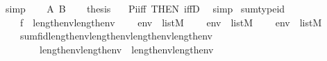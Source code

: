 \begin{isabellebody}
\ simp\isanewline
\ \ \isamarkupfalse%
\ A\ B\isanewline
\ \ \isamarkupfalse%
\ {\isacharquery}{\kern0pt}thesis\ \isamarkupfalse%
\ \ Pi{\isacharunderscore}{\kern0pt}iff\ {\isacharbrackleft}{\kern0pt}THEN\ iffD{}{\isacharbrackright}{\kern0pt}\ \isamarkupfalse%
\ simp\isanewline
{}\isamarkupfalse%
%
\endisatagproof
{\isafoldproof}%
%
\isadelimproof
\isanewline
%
\endisadelimproof
\isanewline
{}\isamarkupfalse%
\ sum{\isacharunderscore}{\kern0pt}type{\isacharunderscore}{\kern0pt}id\ {\isacharcolon}{\kern0pt}\isanewline
\ \ \isanewline
\ \ \ \ {\isachardoublequoteopen}f\ {\isasymin}\ length{\isacharparenleft}{\kern0pt}env{\isacharparenright}{\kern0pt}{\isasymrightarrow}length{\isacharparenleft}{\kern0pt}env{\isacharprime}{\kern0pt}{\isacharparenright}{\kern0pt}{\isachardoublequoteclose}\isanewline
\ \ \ \ {\isachardoublequoteopen}env\ {\isasymin}\ list{\isacharparenleft}{\kern0pt}M{\isacharparenright}{\kern0pt}{\isachardoublequoteclose}\isanewline
\ \ \ \ {\isachardoublequoteopen}env{\isacharprime}{\kern0pt}\ {\isasymin}\ list{\isacharparenleft}{\kern0pt}M{\isacharparenright}{\kern0pt}{\isachardoublequoteclose}\isanewline
\ \ \ \ {\isachardoublequoteopen}env{}\ {\isasymin}\ list{\isacharparenleft}{\kern0pt}M{\isacharparenright}{\kern0pt}{\isachardoublequoteclose}\isanewline
\ \ \isanewline
\ \ \ \ {\isachardoublequoteopen}sum{\isacharparenleft}{\kern0pt}f{\isacharcomma}{\kern0pt}id{\isacharparenleft}{\kern0pt}length{\isacharparenleft}{\kern0pt}env{}{\isacharparenright}{\kern0pt}{\isacharparenright}{\kern0pt}{\isacharcomma}{\kern0pt}length{\isacharparenleft}{\kern0pt}env{\isacharparenright}{\kern0pt}{\isacharcomma}{\kern0pt}length{\isacharparenleft}{\kern0pt}env{\isacharprime}{\kern0pt}{\isacharparenright}{\kern0pt}{\isacharcomma}{\kern0pt}length{\isacharparenleft}{\kern0pt}env{}{\isacharparenright}{\kern0pt}{\isacharparenright}{\kern0pt}\ {\isasymin}\isanewline
\ \ \ \ \ \ \ \ {\isacharparenleft}{\kern0pt}length{\isacharparenleft}{\kern0pt}env{\isacharparenright}{\kern0pt}{\isacharhash}{\kern0pt}{\isacharplus}{\kern0pt}length{\isacharparenleft}{\kern0pt}env{}{\isacharparenright}{\kern0pt}{\isacharparenright}{\kern0pt}\ {\isasymrightarrow}\ {\isacharparenleft}{\kern0pt}length{\isacharparenleft}{\kern0pt}env{\isacharprime}{\kern0pt}{\isacharparenright}{\kern0pt}{\isacharhash}{\kern0pt}{\isacharplus}{\kern0pt}length{\isacharparenleft}{\kern0pt}env{}{\isacharparenright}{\kern0pt}{\isacharparenright}{\kern0pt}{\isachardoublequoteclose}\isanewline

\end{isabellebody}
